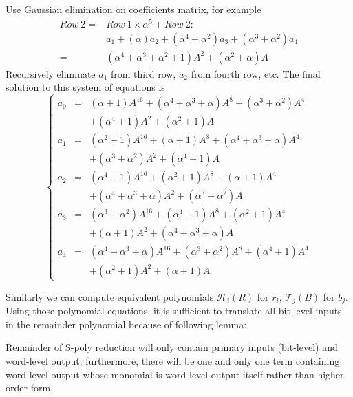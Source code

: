 \begin{Example}
Use Gaussian elimination on coefficients matrix, for example  
\begin{align}
Row\ 2 =& Row\ 1\times \alpha^5 + Row\ 2: \nonumber\\
&a_1+(\alpha)a_2+(\alpha^4+\alpha^2)a_3+(\alpha^3+\alpha^2)a_4\nonumber\\
=&(\alpha^4+\alpha^3+\alpha^2+1)A^2+(\alpha^2+\alpha)A\nonumber
\end{align}
Recursively eliminate $a_1$ from third row, $a_2$ from fourth row, etc. The final solution to this system of
equations is
\begin{displaymath}
\left\{
  \begin{array}{lcl}
  a_0 & = & (\alpha+1)A^{16}+(\alpha^4+\alpha^3+\alpha)A^8+(\alpha^3+\alpha^2)A^4\\&&+(\alpha^4+1)A^2+(\alpha^2+1)A\\
  a_1 & = & (\alpha^2+1)A^{16}+(\alpha+1)A^8+(\alpha^4+\alpha^3+\alpha)A^4\\&&+(\alpha^3+\alpha^2)A^2+(\alpha^4+1)A\\
  a_2 & = & (\alpha^4+1)A^{16}+(\alpha^2+1)A^8+(\alpha+1)A^4\\&&+(\alpha^4+\alpha^3+\alpha)A^2+(\alpha^3+\alpha^2)A\\
  a_3 & = & (\alpha^3+\alpha^2)A^{16}+(\alpha^4+1)A^8+(\alpha^2+1)A^4\\&&+(\alpha+1)A^2+(\alpha^4+\alpha^3+\alpha)A\\
  a_4 & = & (\alpha^4+\alpha^3+\alpha)A^{16}+(\alpha^3+\alpha^2)A^8+(\alpha^4+1)A^4\\&&+(\alpha^2+1)A^2+(\alpha+1)A
  \end{array} \right.
\end{displaymath}
\end{Example}
Similarly we can compute equivalent polynomials $\mathcal{H}_i(R)$ for $r_i$, $\mathcal{T}_j(B)$ for $b_j$.
Using those polynomial equations, it is sufficient to translate all bit-level inputs in the remainder polynomial
because of following lemma:
\begin{Lemma}
\label{lem:bitlevelremainder}
Remainder of S-poly reduction will only contain primary inputs (bit-level) and word-level output; furthermore, there will be one and
only one term containing word-level output whose monomial is word-level output itself rather than higher order form.
\end{Lemma}

